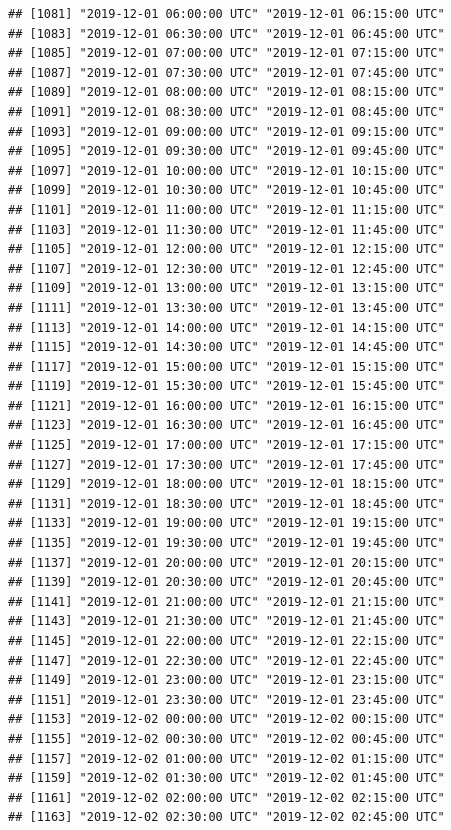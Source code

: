 \documentclass{article}\usepackage[]{graphicx}\usepackage[]{color}
\makeatletter
\newenvironment{kframe}{%
 \def\at@end@of@kframe{}%
 \ifinner\ifhmode%
  \def\at@end@of@kframe{\end{minipage}}%
  \begin{minipage}{\columnwidth}%
 \fi\fi%
 \def\FrameCommand##1{\hskip\@totalleftmargin \hskip-\fboxsep
 \colorbox{shadecolor}{##1}\hskip-\fboxsep
     \hskip-\linewidth \hskip-\@totalleftmargin \hskip\columnwidth}%
 \MakeFramed {\advance\hsize-\width
   \@totalleftmargin\z@ \linewidth\hsize
   \@setminipage}}%
 {\par\unskip\endMakeFramed%
 \at@end@of@kframe}
\newenvironment{knitrout}{}{} %
\makeatother
\begin{document}
\begin{knitrout}
\begin{kframe}
\begin{verbatim}
## [1081] "2019-12-01 06:00:00 UTC" "2019-12-01 06:15:00 UTC"
## [1083] "2019-12-01 06:30:00 UTC" "2019-12-01 06:45:00 UTC"
## [1085] "2019-12-01 07:00:00 UTC" "2019-12-01 07:15:00 UTC"
## [1087] "2019-12-01 07:30:00 UTC" "2019-12-01 07:45:00 UTC"
## [1089] "2019-12-01 08:00:00 UTC" "2019-12-01 08:15:00 UTC"
## [1091] "2019-12-01 08:30:00 UTC" "2019-12-01 08:45:00 UTC"
## [1093] "2019-12-01 09:00:00 UTC" "2019-12-01 09:15:00 UTC"
## [1095] "2019-12-01 09:30:00 UTC" "2019-12-01 09:45:00 UTC"
## [1097] "2019-12-01 10:00:00 UTC" "2019-12-01 10:15:00 UTC"
## [1099] "2019-12-01 10:30:00 UTC" "2019-12-01 10:45:00 UTC"
## [1101] "2019-12-01 11:00:00 UTC" "2019-12-01 11:15:00 UTC"
## [1103] "2019-12-01 11:30:00 UTC" "2019-12-01 11:45:00 UTC"
## [1105] "2019-12-01 12:00:00 UTC" "2019-12-01 12:15:00 UTC"
## [1107] "2019-12-01 12:30:00 UTC" "2019-12-01 12:45:00 UTC"
## [1109] "2019-12-01 13:00:00 UTC" "2019-12-01 13:15:00 UTC"
## [1111] "2019-12-01 13:30:00 UTC" "2019-12-01 13:45:00 UTC"
## [1113] "2019-12-01 14:00:00 UTC" "2019-12-01 14:15:00 UTC"
## [1115] "2019-12-01 14:30:00 UTC" "2019-12-01 14:45:00 UTC"
## [1117] "2019-12-01 15:00:00 UTC" "2019-12-01 15:15:00 UTC"
## [1119] "2019-12-01 15:30:00 UTC" "2019-12-01 15:45:00 UTC"
## [1121] "2019-12-01 16:00:00 UTC" "2019-12-01 16:15:00 UTC"
## [1123] "2019-12-01 16:30:00 UTC" "2019-12-01 16:45:00 UTC"
## [1125] "2019-12-01 17:00:00 UTC" "2019-12-01 17:15:00 UTC"
## [1127] "2019-12-01 17:30:00 UTC" "2019-12-01 17:45:00 UTC"
## [1129] "2019-12-01 18:00:00 UTC" "2019-12-01 18:15:00 UTC"
## [1131] "2019-12-01 18:30:00 UTC" "2019-12-01 18:45:00 UTC"
## [1133] "2019-12-01 19:00:00 UTC" "2019-12-01 19:15:00 UTC"
## [1135] "2019-12-01 19:30:00 UTC" "2019-12-01 19:45:00 UTC"
## [1137] "2019-12-01 20:00:00 UTC" "2019-12-01 20:15:00 UTC"
## [1139] "2019-12-01 20:30:00 UTC" "2019-12-01 20:45:00 UTC"
## [1141] "2019-12-01 21:00:00 UTC" "2019-12-01 21:15:00 UTC"
## [1143] "2019-12-01 21:30:00 UTC" "2019-12-01 21:45:00 UTC"
## [1145] "2019-12-01 22:00:00 UTC" "2019-12-01 22:15:00 UTC"
## [1147] "2019-12-01 22:30:00 UTC" "2019-12-01 22:45:00 UTC"
## [1149] "2019-12-01 23:00:00 UTC" "2019-12-01 23:15:00 UTC"
## [1151] "2019-12-01 23:30:00 UTC" "2019-12-01 23:45:00 UTC"
## [1153] "2019-12-02 00:00:00 UTC" "2019-12-02 00:15:00 UTC"
## [1155] "2019-12-02 00:30:00 UTC" "2019-12-02 00:45:00 UTC"
## [1157] "2019-12-02 01:00:00 UTC" "2019-12-02 01:15:00 UTC"
## [1159] "2019-12-02 01:30:00 UTC" "2019-12-02 01:45:00 UTC"
## [1161] "2019-12-02 02:00:00 UTC" "2019-12-02 02:15:00 UTC"
## [1163] "2019-12-02 02:30:00 UTC" "2019-12-02 02:45:00 UTC"

\end{verbatim}
\end{kframe}
\end{knitrout}
\end{document}
